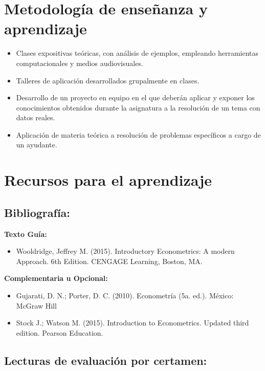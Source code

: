 \documentclass[10pt,a4paper]{article}
\begin{document}
\section{Metodología de enseñanza y aprendizaje}

\begin{itemize}
    \item Clases expositivas teóricas, con análisis de ejemplos, empleando herramientas computacionales y medios audiovisuales.
    \item Talleres de aplicación desarrollados grupalmente en clases.
    \item Desarrollo de un proyecto en equipo en el que deberán aplicar y exponer los conocimientos obtenidos durante la asignatura a la resolución de un tema con datos reales.
    \item Aplicación de materia teórica a resolución de problemas específicos a cargo de un ayudante.
\end{itemize}


\section{Recursos para el aprendizaje}

\subsection{Bibliografía:}

\textbf{Texto Guía:}
\begin{itemize}
    \item Wooldridge, Jeffrey M. (2015). Introductory Econometrics: A modern Approach. 6th Edition. CENGAGE Learning, Boston, MA.
\end{itemize}

\textbf{Complementaria u Opcional:}
\begin{itemize}
    \item Gujarati, D. N.; Porter, D. C. (2010). Econometría (5a. ed.). México: McGraw Hill
    \item Stock J.; Watson M. (2015). Introduction to Econometrics. Updated third edition. Pearson Education.   
\end{itemize}

\subsection{Lecturas de evaluación por certamen:}
\end{document}

